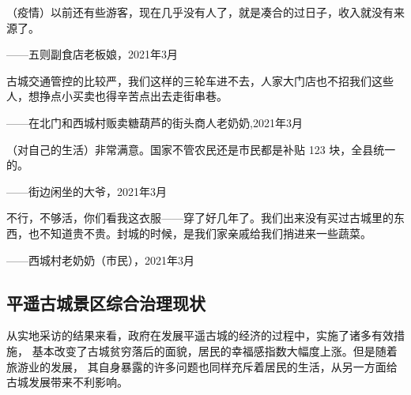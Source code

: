 \documentclass[UTF8]{ctexart}
\begin{document}
    （疫情）以前还有些游客，现在几乎没有人了，就是凑合的过日子，收入就没有来源了。
    
    \begin{flushright}
        ——五则副食店老板娘，2021年3月
    \end{flushright}
    
    古城交通管控的比较严，我们这样的三轮车进不去，人家大门店也不招我们这些人，想挣点小买卖也得辛苦点出去走街串巷。
    
    \begin{flushright}
        ——在北门和西城村贩卖糖葫芦的街头商人老奶奶,2021年3月
    \end{flushright}
    
    （对自己的生活）非常满意。国家不管农民还是市民都是补贴 123 块，全县统一的。
    
    \begin{flushright}
        ——街边闲坐的大爷，2021年3月
    \end{flushright}
    
    不行，不够活，你们看我这衣服——穿了好几年了。我们出来没有买过古城里的东西，也不知道贵不贵。封城的时候，是我们家亲戚给我们捎进来一些蔬菜。
    
    \begin{flushright}
        ——西城村老奶奶（市民），2021年3月
    \end{flushright}
    
     
    \subsection{平遥古城景区综合治理现状}
    从实地采访的结果来看，政府在发展平遥古城的经济的过程中，实施了诸多有效措施， 基本改变了古城贫穷落后的面貌，居民的幸福感指数大幅度上涨。但是随着旅游业的发展， 其自身暴露的许多问题也同样充斥着居民的生活，从另一方面给古城发展带来不利影响。
\end{document}
